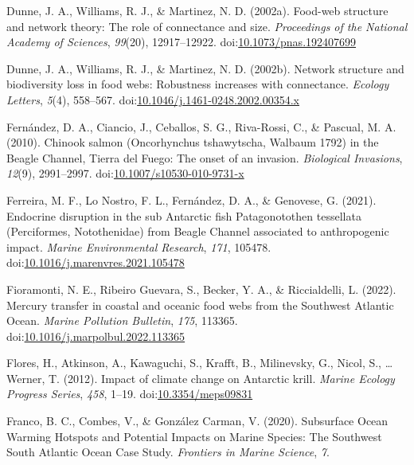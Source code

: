 \documentclass[
]{article}
\newlength{\cslhangindent}
\newlength{\cslentryspacingunit} %
\newenvironment{CSLReferences}[2] %
 {%
  \setlength{\parindent}{0pt}
  \ifodd #1
  \let\oldpar\par
  \def\par{\hangindent=\cslhangindent\oldpar}
  \fi
  \setlength{\parskip}{#2\cslentryspacingunit}
 }%
 {}
\begin{document}
\begin{CSLReferences}{1}{0}
\leavevmode{}%
Dunne, J. A., Williams, R. J., \& Martinez, N. D. (2002a). Food-web
structure and network theory: {The} role of connectance and size.
\emph{Proceedings of the National Academy of Sciences}, \emph{99}(20),
12917--12922.
doi:\href{https://doi.org/10.1073/pnas.192407699}{10.1073/pnas.192407699}

\leavevmode{}%
Dunne, J. A., Williams, R. J., \& Martinez, N. D. (2002b). Network
structure and biodiversity loss in food webs: Robustness increases with
connectance. \emph{Ecology Letters}, \emph{5}(4), 558--567.
doi:\href{https://doi.org/10.1046/j.1461-0248.2002.00354.x}{10.1046/j.1461-0248.2002.00354.x}

\leavevmode{}%
Fernández, D. A., Ciancio, J., Ceballos, S. G., Riva-Rossi, C., \&
Pascual, M. A. (2010). Chinook salmon ({Oncorhynchus} tshawytscha,
{Walbaum} 1792) in the {Beagle Channel}, {Tierra} del {Fuego}: The onset
of an invasion. \emph{Biological Invasions}, \emph{12}(9), 2991--2997.
doi:\href{https://doi.org/10.1007/s10530-010-9731-x}{10.1007/s10530-010-9731-x}

\leavevmode{}%
Ferreira, M. F., Lo Nostro, F. L., Fernández, D. A., \& Genovese, G.
(2021). Endocrine disruption in the sub {Antarctic} fish
{Patagonotothen} tessellata ({Perciformes}, {Notothenidae}) from {Beagle
Channel} associated to anthropogenic impact. \emph{Marine Environmental
Research}, \emph{171}, 105478.
doi:\href{https://doi.org/10.1016/j.marenvres.2021.105478}{10.1016/j.marenvres.2021.105478}

\leavevmode{}%
Fioramonti, N. E., Ribeiro Guevara, S., Becker, Y. A., \& Riccialdelli,
L. (2022). Mercury transfer in coastal and oceanic food webs from the
{Southwest Atlantic Ocean}. \emph{Marine Pollution Bulletin},
\emph{175}, 113365.
doi:\href{https://doi.org/10.1016/j.marpolbul.2022.113365}{10.1016/j.marpolbul.2022.113365}

\leavevmode{}%
Flores, H., Atkinson, A., Kawaguchi, S., Krafft, B., Milinevsky, G.,
Nicol, S., \ldots{} Werner, T. (2012). Impact of climate change on
{Antarctic} krill. \emph{Marine Ecology Progress Series}, \emph{458},
1--19. doi:\href{https://doi.org/10.3354/meps09831}{10.3354/meps09831}

\leavevmode{}%
Franco, B. C., Combes, V., \& González Carman, V. (2020). Subsurface
{Ocean Warming Hotspots} and {Potential Impacts} on {Marine Species}:
{The Southwest South Atlantic Ocean Case Study}. \emph{Frontiers in
Marine Science}, \emph{7}.


\end{CSLReferences}
\end{document}
